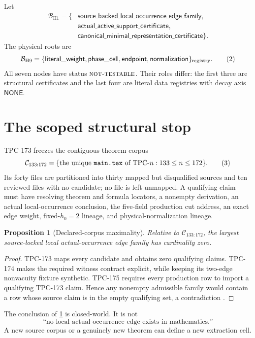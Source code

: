 \documentclass[11pt]{article}
\newtheorem{proposition}[theorem]{Proposition}
\theoremstyle{definition}
\theoremstyle{remark}
\newcommand{\NT}{\textnormal{\textsc{not-testable}}}
\begin{document}
Let
\[
\begin{split}
\mathcal B_{\mathrm{H1}}=\{&
\mathsf{source\_backed\_local\_occurrence\_edge\_family},\\[-2pt]
&\mathsf{actual\_active\_support\_certificate},\\[-2pt]
&\mathsf{canonical\_minimal\_representation\_certificate}\}.
\end{split}
\tag{1}\label{eq:h1-roots}
\]
The physical roots are
\[
\mathcal B_{\mathrm{H9}}=
\{\mathsf{literal\_weight},\mathsf{phase\_cell},
\mathsf{endpoint},\mathsf{normalization}\}_{\rm registry}.
\tag{2}\label{eq:h9-roots}
\]
All seven nodes have status \(\NT\).  Their roles differ: the first
three are structural certificates and the last four are literal data
registries with decay axis \(\mathsf{NONE}\).

\section{The scoped structural stop}

TPC-173 freezes the contiguous theorem corpus
\[
\mathcal C_{133:172}
=\{\text{the unique \texttt{main.tex} of TPC-}n:
133\leq n\leq 172\}.
\tag{3}\label{eq:corpus}
\]
Its forty files are partitioned into thirty mapped but disqualified
sources and ten reviewed files with no candidate; no file is left
unmapped.  A qualifying claim must have resolving theorem and formula
locators, a nonempty derivation, an actual local-occurrence
conclusion, the five-field production cut address, an exact edge
weight, fixed-\(h_0=2\) lineage, and physical-normalization lineage.

\begin{proposition}[Declared-corpus maximality]\label{prop:empty}
Relative to \(\mathcal C_{133:172}\), the largest source-locked local
actual-occurrence edge family has cardinality zero.
\end{proposition}

\begin{proof}
TPC-173 maps every candidate and obtains zero qualifying claims.
TPC-174 makes the required witness contract explicit, while keeping
its two-edge nonvacuity fixture synthetic.  TPC-175 requires every
production row to import a qualifying TPC-173 claim.  Hence any
nonempty admissible family would contain a row whose source claim is
in the empty qualifying set, a contradiction
\citep{WangTPC173,WangTPC174,WangTPC175}.
\end{proof}

The conclusion of \cref{prop:empty} is closed-world.  It is not
\[
\text{``no local actual-occurrence edge exists in mathematics.''}
\tag{4}\label{eq:not-global}
\]
A new source corpus or a genuinely new theorem can define a new
extraction cell.
\end{document}
